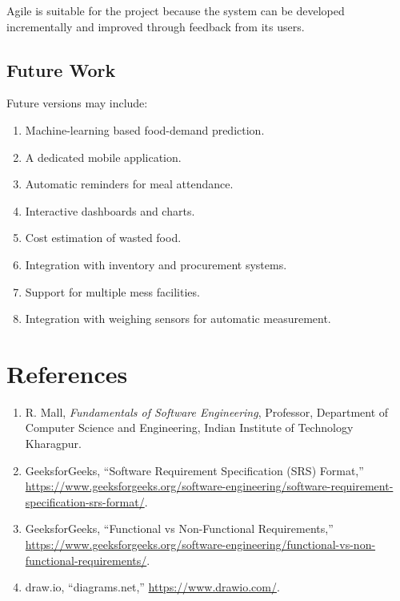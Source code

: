 \documentclass[12pt,a4paper]{report}
\begin{document}
	Agile is suitable for the project because the system can be developed incrementally and improved through feedback from its users.
	
	\section{Future Work}
	
	Future versions may include:
	
	\begin{enumerate}[leftmargin=*]
		\item Machine-learning based food-demand prediction.
		\item A dedicated mobile application.
		\item Automatic reminders for meal attendance.
		\item Interactive dashboards and charts.
		\item Cost estimation of wasted food.
		\item Integration with inventory and procurement systems.
		\item Support for multiple mess facilities.
		\item Integration with weighing sensors for automatic measurement.
	\end{enumerate}
	
	
\chapter{References}

\begin{enumerate}[leftmargin=*]
	
	\item R. Mall, \textit{Fundamentals of Software Engineering}, Professor, Department of Computer Science and Engineering, Indian Institute of Technology Kharagpur.
	
	\item GeeksforGeeks, ``Software Requirement Specification (SRS) Format,'' \url{https://www.geeksforgeeks.org/software-engineering/software-requirement-specification-srs-format/}.
	
	\item GeeksforGeeks, ``Functional vs Non-Functional Requirements,'' \url{https://www.geeksforgeeks.org/software-engineering/functional-vs-non-functional-requirements/}.
	
	\item draw.io, ``diagrams.net,'' \url{https://www.drawio.com/}.
	
\end{enumerate}
	
\end{document}
